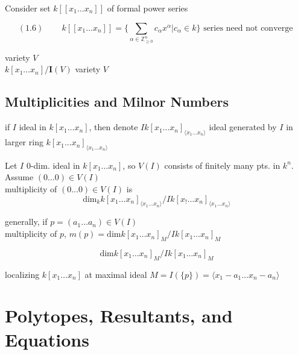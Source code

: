 Consider set $k[[x_1 \dots x_n]]$ of formal power series

\begin{equation}
  (1.6) \quad \quad \, k[[x_1 \dots x_n]] = \lbrace \sum_{\alpha \in \mathbb{Z}^n_{\geq 0}} c_{\alpha} x^{\alpha} | c_{\alpha} \in k \rbrace \text{ series need not converge }
\end{equation} 


variety $V$ \\

$k[x_1\dots x_n]/\mathbf{I}(V)$ \phantom{ \quad \quad \quad } variety $V$


\subsection{Multiplicities and Milnor Numbers}


if $I$ ideal in $k[x_1\dots x_n]$, then denote $Ik[x_1\dots x_n]_{\langle x_1 \dots x_n \rangle}$ ideal generated by $I$ in larger ring $k[x_1\dots x_n]_{\langle x_1 \dots x_n \rangle}$

\begin{definition}[2.1] Let $I$ $0$-dim. ideal in $k[x_1 \dots x_n]$, so $V(I)$ consists of finitely many pts. in $k^n$.  \\
Assume $(0 \dots 0) \in V(I)$ \\
multiplicity of $(0\dots 0)\in V(I)$ is 
\[
\text{dim}_k{ k[x_1\dots x_n]_{\langle x_1\dots x_n \rangle}} / Ik[x_!\dots x_n]_{\langle x_1 \dots x_n \rangle}
\]
\end{definition}


generally, if $p=(a_1 \dots a_n) \in V(I)$ \\
multiplicity of $p$, $m(p) = \text{dim}{ k[x_1 \dots x_n]_M } / Ik[x_1 \dots x_n]_M$

\[
\text{dim}{ k[x_1 \dots x_n]_M } / Ik[x_1 \dots x_n]_M
\]

localizing $k[x_1 \dots x_n]$ at maximal ideal $M = I(\lbrace p \rbrace) = \langle x_1 - a_1 \dots x_n-a_n \rangle$


\section{}

\section{}

\section{ Polytopes, Resultants, and Equations }

